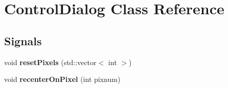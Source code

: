 \hypertarget{classControlDialog}{
\section{ControlDialog Class Reference}
\label{classControlDialog}
}
\subsection*{Signals}
\begin{DoxyCompactItemize}
\item 
\hypertarget{classControlDialog_a21c5d2e4ca9f7e8ed3ddcbf01317c147}{
void {\bfseries resetPixels} (std::vector$<$ int $>$)}
\label{classControlDialog_a21c5d2e4ca9f7e8ed3ddcbf01317c147}

\item 
\hypertarget{classControlDialog_a2440ee69d4ea1d8db76da64a811a8682}{
void {\bfseries recenterOnPixel} (int pixnum)}
\label{classControlDialog_a2440ee69d4ea1d8db76da64a811a8682}

\end{DoxyCompactItemize}
